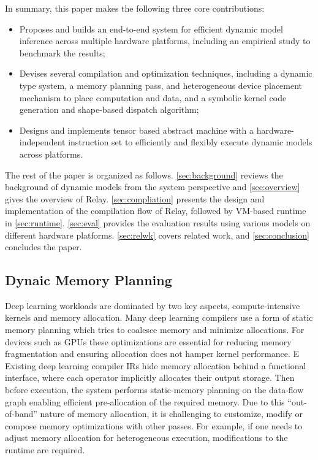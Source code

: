 In summary, this paper makes the following three core contributions:
\begin{itemize}
    \item Proposes and builds an end-to-end system for efficient dynamic model inference across multiple hardware platforms, including an empirical study to benchmark the results;
    \item Devises several compilation and optimization techniques,
    including a dynamic type system, a memory planning pass, and heterogeneous device placement mechanism to place computation and data, and a symbolic kernel code generation and shape-based dispatch algorithm;
    \item Designs and implements tensor based abstract machine with a hardware-independent instruction set to efficiently and flexibly execute dynamic models across platforms.
\end{itemize}

The rest of the paper is organized as follows. \autoref{sec:background} reviews the background of dynamic models from the system perspective and \autoref{sec:overview} gives the overview of Relay.
\autoref{sec:compliation} presents the design and implementation of the compilation flow of Relay, followed by VM-based runtime in \autoref{sec:runtime}. \autoref{sec:eval} provides the evaluation results using various models on different hardware platforms.
\autoref{sec:relwk} covers related work, and \autoref{sec:conclusion} concludes the paper.


\subsection{Dynaic Memory Planning}
\label{sec:compliation:memory}
Deep learning workloads are dominated by two key aspects,
  compute-intensive kernels and memory allocation.
Many deep learning compilers use a form of static memory planning which tries to
  coalesce memory and minimize allocations.
For devices such as GPUs these optimizations are essential for reducing memory fragmentation and ensuring allocation
  does not hamper kernel performance. E
Existing deep learning compiler IRs hide memory allocation behind a functional interface,
  where each operator implicitly allocates their output storage.
Then before execution, the system performs static-memory planning on the data-flow graph enabling efficient pre-allocation of the required memory. Due to this ``out-of-band'' nature of memory allocation, it is challenging to customize, modify or compose memory optimizations with other passes. For example, if one needs to adjust memory allocation for heterogeneous execution, modifications to the runtime are required.

